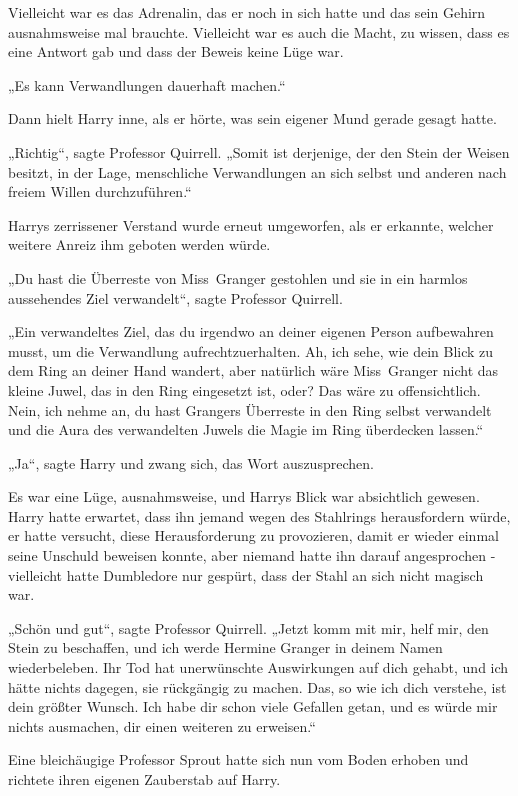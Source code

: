 {Vielleicht war es das Adrenalin, das er noch in sich hatte und das sein Gehirn ausnahmsweise mal brauchte. Vielleicht war es auch die Macht, zu wissen, dass es eine Antwort gab und dass der Beweis keine Lüge war.

„Es kann Verwandlungen dauerhaft machen.“

Dann hielt Harry inne, als er hörte, was sein eigener Mund gerade gesagt hatte.

„Richtig“, sagte Professor Quirrell. „Somit ist derjenige, der den Stein der Weisen besitzt, in der Lage, menschliche Verwandlungen an sich selbst und anderen nach freiem Willen durchzuführen.“

Harrys zerrissener Verstand wurde erneut umgeworfen, als er erkannte, welcher weitere Anreiz ihm geboten werden würde.

„Du hast die Überreste von Miss~Granger gestohlen und sie in ein harmlos aussehendes Ziel verwandelt“, sagte Professor Quirrell.

„Ein verwandeltes Ziel, das du irgendwo an deiner eigenen Person aufbewahren musst, um die Verwandlung aufrechtzuerhalten. Ah, ich sehe, wie dein Blick zu dem Ring an deiner Hand wandert, aber natürlich wäre Miss~Granger nicht das kleine Juwel, das in den Ring eingesetzt ist, oder? Das wäre zu offensichtlich. Nein, ich nehme an, du hast Grangers Überreste in den Ring selbst verwandelt und die Aura des verwandelten Juwels die Magie im Ring überdecken lassen.“

„Ja“, sagte Harry und zwang sich, das Wort auszusprechen.

Es war eine Lüge, ausnahmsweise, und Harrys Blick war absichtlich gewesen. Harry hatte erwartet, dass ihn jemand wegen des Stahlrings herausfordern würde, er hatte versucht, diese Herausforderung zu provozieren, damit er wieder einmal seine Unschuld beweisen konnte, aber niemand hatte ihn darauf angesprochen - vielleicht hatte Dumbledore nur gespürt, dass der Stahl an sich nicht magisch war.

„Schön und gut“, sagte Professor Quirrell. „Jetzt komm mit mir, helf mir, den Stein zu beschaffen, und ich werde Hermine Granger in deinem Namen wiederbeleben. Ihr Tod hat unerwünschte Auswirkungen auf dich gehabt, und ich hätte nichts dagegen, sie rückgängig zu machen. Das, so wie ich dich verstehe, ist dein größter Wunsch. Ich habe dir schon viele Gefallen getan, und es würde mir nichts ausmachen, dir einen weiteren zu erweisen.“

Eine bleichäugige Professor Sprout hatte sich nun vom Boden erhoben und richtete ihren eigenen Zauberstab auf Harry.

}
